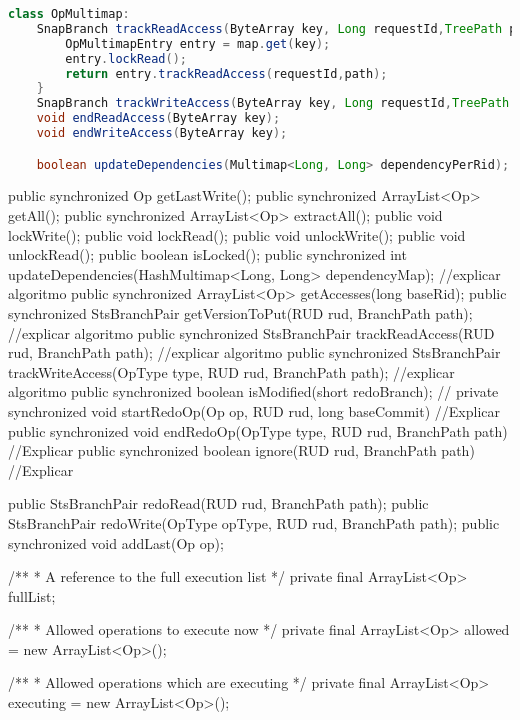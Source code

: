 \begin{minipage}{\textwidth}
\begin{lstlisting}[language=java,firstnumber=1,backgroundcolor=\color{grey},mathescape,caption={Class of the operations multimap (pseudo-code)},label={code:multimap}]
class OpMultimap:
	SnapBranch trackReadAccess(ByteArray key, Long requestId,TreePath path){
		OpMultimapEntry entry = map.get(key);
		entry.lockRead();
		return entry.trackReadAccess(requestId,path);
	}
	SnapBranch trackWriteAccess(ByteArray key, Long requestId,TreePath path);
	void endReadAccess(ByteArray key);
	void endWriteAccess(ByteArray key);

	boolean updateDependencies(Multimap<Long, Long> dependencyPerRid);
\end{lstlisting}
\end{minipage}

public synchronized Op getLastWrite();
public synchronized ArrayList<Op> getAll();
public synchronized ArrayList<Op> extractAll();
public void lockWrite();
public void lockRead();
public void unlockWrite();
public void unlockRead();
public boolean isLocked();
public synchronized int updateDependencies(HashMultimap<Long, Long> dependencyMap); //explicar algoritmo
public synchronized ArrayList<Op> getAccesses(long baseRid);
public synchronized StsBranchPair getVersionToPut(RUD rud, BranchPath path); //explicar algoritmo
public synchronized StsBranchPair trackReadAccess(RUD rud, BranchPath path); //explicar algoritmo
public synchronized StsBranchPair trackWriteAccess(OpType type, RUD rud, BranchPath path); //explicar algoritmo
public synchronized boolean isModified(short redoBranch); //
private synchronized void startRedoOp(Op op, RUD rud, long baseCommit) //Explicar
public synchronized void endRedoOp(OpType type, RUD rud, BranchPath path) //Explicar
public synchronized boolean ignore(RUD rud, BranchPath path) //Explicar

public StsBranchPair redoRead(RUD rud, BranchPath path);
public StsBranchPair redoWrite(OpType opType, RUD rud, BranchPath path);
public synchronized void addLast(Op op);



/**
    * A reference to the full execution list
    */
   private final ArrayList<Op> fullList;

   /**
    * Allowed operations to execute now
    */
   private final ArrayList<Op> allowed = new ArrayList<Op>();

   /**
    * Allowed operations which are executing
    */
   private final ArrayList<Op> executing = new ArrayList<Op>();

